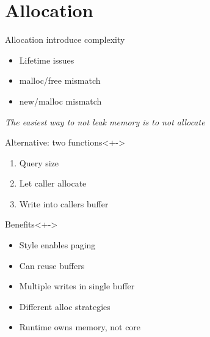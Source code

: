 \documentclass[pdf]{beamer}
\begin{document}
\section{Allocation}

\begin{frame}
    \begin{block}{Allocation introduce complexity}
        \pause
        \begin{itemize}[<+>]
            \item Lifetime issues
            \item malloc/free mismatch
            \item new/malloc mismatch
        \end{itemize}
    \end{block}

\end{frame}

\begin{frame}
    \emph{The easiest way to not leak memory is to not allocate}
\end{frame}

\begin{frame}
    \begin{block}{Alternative: two functions}<+->
        \begin{enumerate}[<+->]
            \item Query size
            \item Let caller allocate
            \item Write into callers buffer
        \end{enumerate}
    \end{block}

    \begin{block}{Benefits}<+->
        \begin{itemize}[<+>]
            \item Style enables paging
            \item Can reuse buffers
            \item Multiple writes in single buffer
            \item Different alloc strategies
            \item Runtime owns memory, not core
        \end{itemize}
    \end{block}

    \note{
    }
\end{frame}
\end{document}
